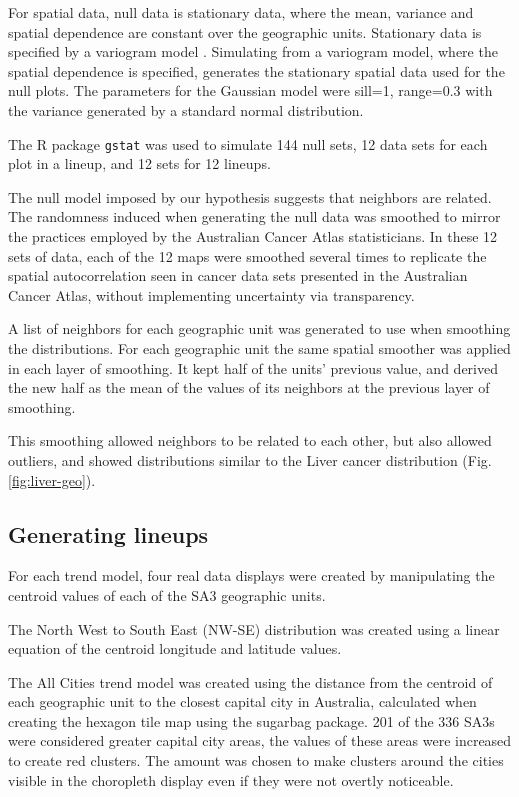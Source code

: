 \documentclass{monashthesis}
\begin{document}
For spatial data, null data is stationary data, where the mean, variance and spatial dependence are constant over the geographic units. Stationary data is specified by a variogram model \autocite{POG}. Simulating from a variogram model, where the spatial dependence is specified, generates the stationary spatial data used for the null plots. The parameters for the Gaussian model were sill=1, range=0.3 with the variance generated by a standard normal distribution.

The R package \texttt{gstat} \autocite{gstat} was used to simulate 144 null sets, 12 data sets for each plot in a lineup, and 12 sets for 12 lineups.

The null model imposed by our hypothesis suggests that neighbors are related. The randomness induced when generating the null data was smoothed to mirror the practices employed by the Australian Cancer Atlas statisticians.
In these 12 sets of data, each of the 12 maps were smoothed several times to replicate the spatial autocorrelation seen in cancer data sets presented in the Australian Cancer Atlas, without implementing uncertainty via transparency.

A list of neighbors for each geographic unit was generated to use when smoothing the distributions. For each geographic unit the same spatial smoother was applied in each layer of smoothing. It kept half of the units' previous value, and derived the new half as the mean of the values of its neighbors at the previous layer of smoothing.

This smoothing allowed neighbors to be related to each other, but also allowed outliers, and showed distributions similar to the Liver cancer distribution (Fig. \ref{fig:liver-geo}).

\hypertarget{generating-lineups}{%
\subsection{Generating lineups}\label{generating-lineups}}

For each trend model, four real data displays were created by manipulating the centroid values of each of the SA3 geographic units.

The North West to South East (NW-SE) distribution was created using a linear equation of the centroid longitude and latitude values.

The All Cities trend model was created using the distance from the centroid of each geographic unit to the closest capital city in Australia, calculated when creating the hexagon tile map using the sugarbag \autocite{sugarbag} package.
201 of the 336 SA3s were considered greater capital city areas, the values of these areas were increased to create red clusters. The amount was chosen to make clusters around the cities visible in the choropleth display even if they were not overtly noticeable.
\end{document}
